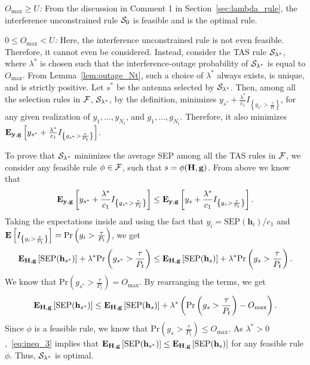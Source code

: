 \documentclass[12pt,draftcls,peerreview,onecolumn]{IEEEtran}
\newcommand{\brac}[1]{\left({#1}\right)}
\newcommand{\cbrac}[1]{\left\{{#1}\right\}}
\newcommand{\indic}[1]{I_{\cbrac{#1}}}
\newcommand{\mtx}[1]{{\bf #1}} %
\newcommand{\expect}[1]{{\bf{E}}\left[{#1}\right]}
\newcommand{\explow}[2]{{\bf{E}}_{#1}\left[{#2}\right]}
\newcommand{\prob}[1]{\text{Pr}\brac{#1}}
\newcommand{\SEP}{\text{SEP}}
\newcommand{\y}{\mathbf{y}}
\newcommand{\lam}{\lambda}
\newcommand{\lamstar}{\lam^{*}}
\newcommand{\sstar}{s^{*}}
\newcommand{\F}{\cal{F}}
\newcommand{\Nt}{{N_t}}
\newcommand{\Pt}{{P_t}}
\newcommand{\such}{h}
\newcommand{\puch}{g}
\newcommand{\gk}[1]{{\puch_{#1}}}
\newcommand{\g}{\mathbf{\puch}}
\newcommand{\outmax}{O_{\text{max}}}
\newcommand{\itau}{\tau}
\newcommand{\cone}{c_{1}}
\newcommand{\taubypt}{\frac{\itau}{\Pt}}
\newcommand{\gkgrtaubypt}[1]{{\gk{#1}}>\taubypt}
\newcommand{\gindic}[1]{\indic{\gkgrtaubypt{#1}}}
\newcommand{\yk}[1]{y_{#1}}
\newcommand{\un}{U}
\newcommand{\asrule}{\phi}
\newcommand{\Hmx}{\mtx{H}}
\newcommand{\caluncons}{{\cal S_{\text{0}}}}
\newcommand{\callamstarrule}{\cal S_{\lam^{*}}}
\begin{document}
{\em $\outmax\geq\un$:} From the discussion in Comment 1 in Section~\ref{sec:lambda_rule}, the interference unconstrained rule $\caluncons$ is feasible and is the optimal rule. 

{\em $0\leq\outmax<\un$:} Here, the interference unconstrained rule is not even feasible. Therefore, it cannot even be considered. Instead, consider the TAS rule $\callamstarrule$, where $\lamstar$ is chosen such that the interference-outage probability of $\callamstarrule$ is equal to $\outmax$. From Lemma~\ref{lem:outage_Nt}, such a choice of $\lamstar$ always exists, is unique, and is strictly positive. Let $\sstar$ be the antenna selected by $\callamstarrule$. Then, among all the selection rules in $\F$, $\callamstarrule$, by the definition,  minimizes $\yk{{\sstar}} + \frac{\lamstar}{\cone}\gindic{{\sstar}}$, for any given realization of $\yk{1},\ldots,\yk{\Nt}$, and $\gk{1},\ldots,\gk{\Nt}$. Therefore, it also minimizes $\explow{\y,\g}{\yk{{\sstar}} + \frac{\lamstar}{\cone}\gindic{{\sstar}}}$. 

To prove that $\callamstarrule$ minimizes the average SEP among all the TAS rules in $\F$, we consider any feasible rule $\asrule\in\F$, such that  $s=\phi(\Hmx,\g)$. From above we know that   
\begin{equation}
\label{eq:opt_rul_1}  
   \explow{\y,\g}{\yk{{\sstar}} + \frac{\lamstar}{\cone}\gindic{{\sstar}}} \leq  \explow{\y,\g}{\yk{{s}} + \frac{\lamstar}{\cone}\gindic{{s}}}.
\end{equation}
Taking the expectations inside and using the fact that $\yk{i}={\SEP(\mathbf{\such}_{i})}/{\cone}$ and $\expect{\gindic{i}}=\prob{\gk{i}>\taubypt}$, we get
%
\begin{equation}
\label{eq:opt_rul_2}
   \explow{\Hmx,\g}{\SEP(\hsstar)} + \lamstar  \prob{\gk{\sstar}>\taubypt} \leq  \explow{\Hmx,\g}{\SEP(\hs)} + \lamstar  \prob{\gk{s}>\taubypt}.
\end{equation}
%
We know that $\prob{\gk{\sstar}>\taubypt}=\outmax$. By rearranging the terms, we get
%
\begin{equation}
\label{eq:ineq_3}
\explow{\Hmx,\g}{\SEP(\hsstar)} \leq \explow{\Hmx,\g}{\SEP(\hs)} + \lamstar \left( \prob{\gk{s}>\taubypt} -  \outmax \right).
\end{equation}
%
Since $\phi$ is a feasible rule, we know that $\prob{\gkgrtaubypt{s}}\leq \outmax$. As $\lamstar>0$,~\eqref{eq:ineq_3} implies that $\explow{\Hmx,\g}{\SEP(\hsstar)} \leq \explow{\Hmx,\g}{\SEP(\hs)}$ for any feasible rule $\phi$. Thus, $\callamstarrule$ is optimal.
\end{document}
